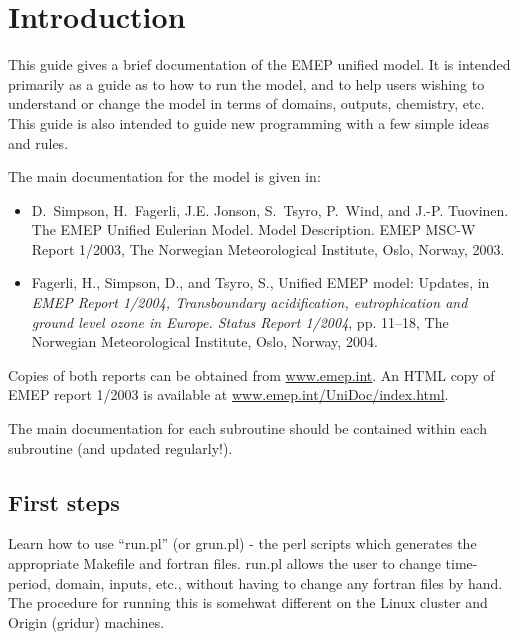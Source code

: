 \chapter{Introduction}

This guide gives a brief documentation of the EMEP unified model.
It is intended primarily as a guide as to how to run the model, and
to help users wishing to understand or change 
the model in terms of domains, outputs, chemistry, etc.
This guide is also intended to guide new programming with a few
simple ideas and rules.

The main documentation for the model is given in:

\begin{itemize}
\item
D.~Simpson, H.~Fagerli, J.E. Jonson, S.~Tsyro, P.~Wind, and J.-P. Tuovinen.
{The EMEP Unified Eulerian Model. Model Description}.
EMEP MSC-W Report 1/2003, The Norwegian
Meteorological Institute, Oslo, Norway, 2003.
\item
Fagerli, H., Simpson, D., and Tsyro, S., {Unified EMEP model: Updates}, in {\em
  EMEP Report 1/2004, Transboundary acidification, eutrophication and ground
  level ozone in Europe. Status Report 1/2004\/}, pp. 11--18, The Norwegian
  Meteorological Institute, Oslo, Norway, 2004.
\end{itemize}

Copies of both reports can be obtained from \url{www.emep.int}. An HTML
copy of EMEP report 1/2003 is available at \url{www.emep.int/UniDoc/index.html}.




The main documentation for each subroutine should be contained within
each subroutine (and updated regularly!).

\section{First steps}

Learn how to use ``run.pl'' (or grun.pl) - the perl scripts which generates
the appropriate Makefile and fortran files. run.pl allows
the user to change time-period, domain, inputs, etc., without
having to change any fortran files by hand. The procedure for running
this is somehwat different on the Linux cluster and  Origin (gridur)
machines.

